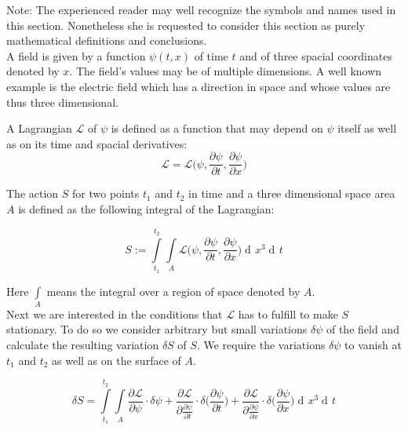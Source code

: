\documentclass{article}
\DeclareMathOperator{\dd}{d\!}
\begin{document}
Note: The experienced reader may well recognize the symbols and names used in this section. Nonetheless she is requested to consider this section as purely mathematical definitions and conclusions. \\

A field is given by a function $\psi(t,x)$ of time $t$ and of three spacial coordinates denoted by $x$. The field's values may be of multiple dimensions. A well known example is the electric field which has a direction in space and whose values are thus three dimensional.

A Lagrangian $\mathcal{L}$ of $\psi$ is defined as a function that may depend on $\psi$ itself as well as on its time and spacial derivatives: 
\begin{equation}
\mathcal{L} = \mathcal{L}\bigg(\psi, \frac{\partial \psi}{\partial t}, \frac{\partial \psi}{\partial x}\bigg)
\end{equation}

The action $S$ for two points $t_1$ and $t_2$ in time and a three dimensional space area $A$  is defined as the following integral of the Lagrangian:

\begin{equation}
S := \int\limits_{t_1}^{t_2} \int\limits_{A} \mathcal{L}\bigg(\psi, \frac{\partial \psi}{\partial t}, \frac{\partial \psi}{\partial x}\bigg) \dd x^3 \dd t
\end{equation}

Here $\int\limits_{A}$ means the integral over a region of space denoted by $A$.\\


Next we are interested in the conditions that $\mathcal{L}$ has to fulfill to make $S$ stationary. To do so we consider arbitrary but small variations $\delta\psi$ of the field and calculate the resulting variation $\delta S$ of $S$. We require the variations $\delta\psi$ to vanish at $t_1$ and $t_2$ as well as on the surface of $A$.

\begin{equation}
\delta S = \int\limits_{t_1}^{t_2} \int\limits_{A} 
\frac{\partial \mathcal{L}}{\partial \psi} \cdot \delta \psi
+ \frac{\partial \mathcal{L}}{\partial \frac{\partial \psi}{\partial t}} \cdot \delta \bigg(\frac{\partial \psi} {\partial t}\bigg)
+ \frac{\partial \mathcal{L}}{\partial \frac{\partial \psi}{\partial x}} \cdot \delta \bigg(\frac{\partial \psi} {\partial x}\bigg)
\dd x^3 \dd t
\end{equation}
\end{document}
